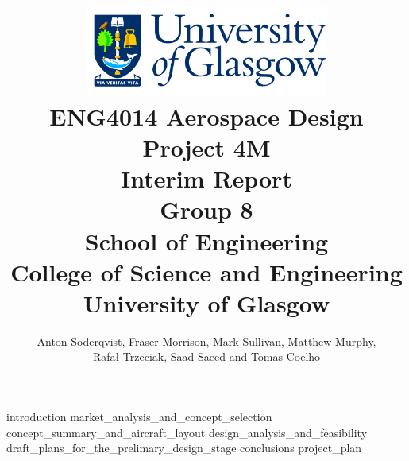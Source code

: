 \documentclass[12pt,titlepage,oneside]{book}
\author{Anton Soderqvist, Fraser Morrison, Mark Sullivan, Matthew Murphy, \\ Rafał Trzeciak, Saad Saeed and Tomas Coelho}
\begin{document}
\title{
\includegraphics[width=0.6\textwidth]{GlaLogo.pdf} \\
ENG4014 Aerospace Design Project 4M \\
Interim Report \\
Group 8  \\ 
\vspace{3em}
\normalsize{School of Engineering \\
College of Science and Engineering \\
University of Glasgow \\
}
}
\maketitle
\setcounter{tocdepth}{1}
\tableofcontents

{introduction}
{market_analysis_and_concept_selection}
{concept_summary_and_aircraft_layout}
{design_analysis_and_feasibility}
{draft_plans_for_the_prelimary_design_stage}
{conclusions}
{project_plan}



\end{document}
